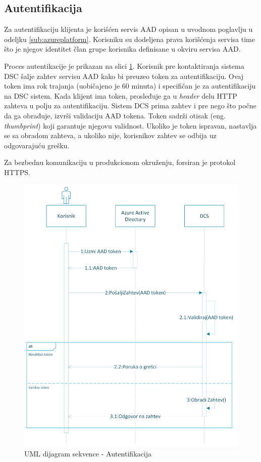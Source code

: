 \documentclass[12pt,oneside]{memoir}
\begin{document}
\subsection{Autentifikacija}

Za autentifikaciju klijenta je korišćen servis AAD \cite{AAD} opisan u uvodnom poglavlju u odeljku \ref{sub:azureplatform}. Korisniku su dodeljena prava korišćenja servisa time što je njegov identitet član grupe korisnika definisane u okviru servisa AAD.

Proces autentikacije je prikazan na slici \ref{fig:autentifikacija}. Korisnik pre kontaktiranja sistema DSC šalje zahtev servisu AAD kako bi preuzeo token za autentifikaciju. Ovaj token ima rok trajanja (uobičajeno je 60 minuta) i specifičan je za autentifikaciju na DSC sistem. Kada klijent ima token, prosleđuje ga u \emph{header} delu HTTP zahteva u polju za autentifikaciju. Sistem DCS prima zahtev i pre nego što počne da ga obrađuje, izvrši validaciju AAD tokena. Token sadrži otisak (eng. \emph{thumbprint}) koji garantuje njegovu validnost. Ukoliko je token ispravan, nastavlja se sa obradom zahteva, a ukoliko nije, korisnikov zahtev se odbija uz odgovarajuću grešku.

Za bezbednu komunikaciju u produkcionom okruženju, forsiran je protokol HTTPS.

\begin{figure}[!ht]
  \centering
  \includegraphics[width=1.0\textwidth]{./images/autentikacija_uml_dijagram_sekvence.png}
  \caption{UML dijagram sekvence - Autentifikacija}
  \label{fig:autentifikacija}
\end{figure}
\end{document}
